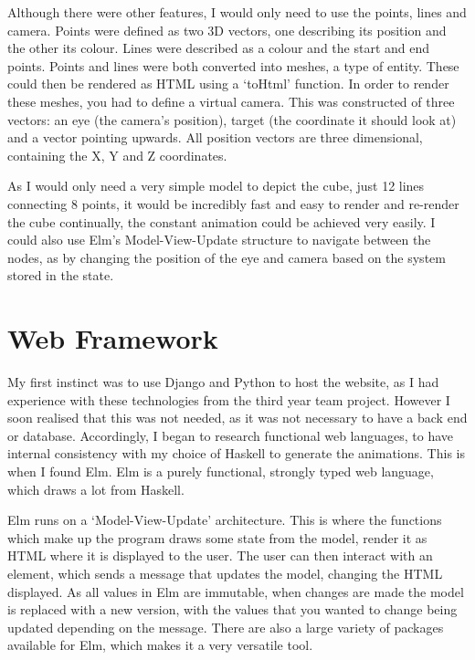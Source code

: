 \documentclass{l4proj}
\begin{document}
Although there were other features, I would only need to use the points, lines and camera.  Points were defined as two 3D vectors, one describing its position and the other its colour.  Lines were described as a colour and the start and end points.  Points and lines were both converted into meshes, a type of entity.  These could then be rendered as HTML using a `toHtml' function.  In order to render these meshes, you had to define a virtual camera.  This was constructed of three vectors: an eye (the camera's position), target (the coordinate it should look at) and a vector pointing upwards.  All position vectors are three dimensional, containing the X, Y and Z coordinates.

As I would only need a very simple model to depict the cube, just 12 lines connecting 8 points, it would be incredibly fast and easy to render and re-render the cube continually, the constant animation could be achieved very easily.  I could also use Elm's Model-View-Update structure to navigate between the nodes, as by changing the position of the eye and camera based on the system stored in the state.

\section{Web Framework}

My first instinct was to use Django and Python to host the website, as I had experience with these technologies from the third year team project.  However I soon realised that this was not needed, as it was not necessary to have a back end or database.  Accordingly, I began to research functional web languages, to have internal consistency with my choice of Haskell to generate the animations.  This is when I found Elm.  Elm is a purely functional, strongly typed web language, which draws a lot from Haskell.

Elm runs on a `Model-View-Update' architecture.  This is where the functions which make up the program draws some state from the model, render it as HTML where it is displayed to the user.  The user can then interact with an element, which sends a message that updates the model, changing the HTML displayed.  As all values in Elm are immutable, when changes are made the model is replaced with a new version, with the values that you wanted to change being updated depending on the message.  There are also a large variety of packages available for Elm, which makes it a very versatile tool.
\end{document}
